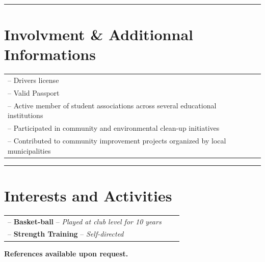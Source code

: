 \documentclass[11pt, a4paper]{article}
\begin{document}
\rule{\textwidth}{0.4pt}  %

\section*{Involvment \& Additionnal Informations}

\begin{tabularx}{\textwidth}{@{}l X r@{}}
    -- Drivers license
    \\
    -- Valid Passport
    \\
    -- Active member of student associations across several educational institutions
    \\
    -- Participated in community and environmental clean-up initiatives 
    \\
    -- Contributed to community improvement projects organized by local municipalities 

\end{tabularx}

\rule{\textwidth}{0.4pt}  %

\section*{Interests and Activities}

\begin{tabularx}{\textwidth}{@{}l X r@{}}
    -- \textbf{Basket-ball} -- \textit{Played at club level for 10 years}
    \\
    -- \textbf{Strength Training} -- \textit{Self-directed}
\end{tabularx}
\textbf{References available upon request.}
\end{document}
